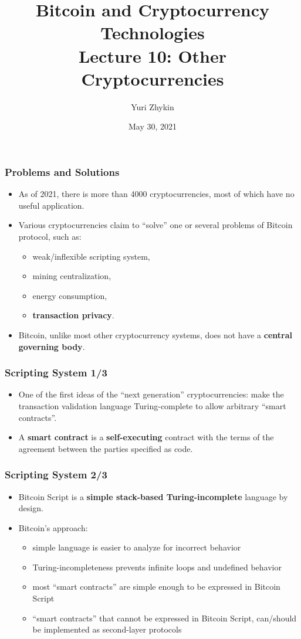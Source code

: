 \documentclass{beamer}
\title{
  Bitcoin and Cryptocurrency Technologies \\
  Lecture 10: Other Cryptocurrencies
}
\author{Yuri Zhykin}
\date{May 30, 2021}
\begin{document}
\frame{\titlepage}

\begin{frame}
  \frametitle{Problems and Solutions}
  \begin{itemize}
  \item As of 2021, there is more than 4000 cryptocurrencies, most of which
    have no useful application.
  \item Various cryptocurrencies claim to ``solve'' one or several problems of
    Bitcoin protocol, such as:
    \begin{itemize}
    \item weak/inflexible scripting system,
    \item mining centralization,
    \item energy consumption,
    \item \textbf{transaction privacy}.
    \end{itemize}
  \item Bitcoin, unlike most other cryptocurrency systems, does not have a
    \textbf{central governing body}.
  \end{itemize}
\end{frame}

\begin{frame}
  \frametitle{Scripting System 1/3}
  \begin{itemize}
  \item One of the first ideas of the ``next generation'' cryptocurrencies: make
    the transaction validation language Turing-complete to allow arbitrary
    ``smart contracts''.
  \item A \textbf{smart contract} is a \textbf{self-executing} contract with the
    terms of the agreement between the parties specified as code.
  \end{itemize}
\end{frame}

\begin{frame}
  \frametitle{Scripting System 2/3}
  \begin{itemize}
  \item Bitcoin Script is a \textbf{simple stack-based Turing-incomplete}
    language by design.
  \item Bitcoin's approach:
    \begin{itemize}
    \item simple language is easier to analyze for incorrect behavior
    \item Turing-incompleteness prevents infinite loops and undefined behavior
    \item most ``smart contracts'' are simple enough to be expressed in Bitcoin
      Script
    \item ``smart contracts'' that cannot be expressed in Bitcoin Script,
      can/should be implemented as second-layer protocols
    \end{itemize}
  \end{itemize}
\end{frame}
\end{document}

